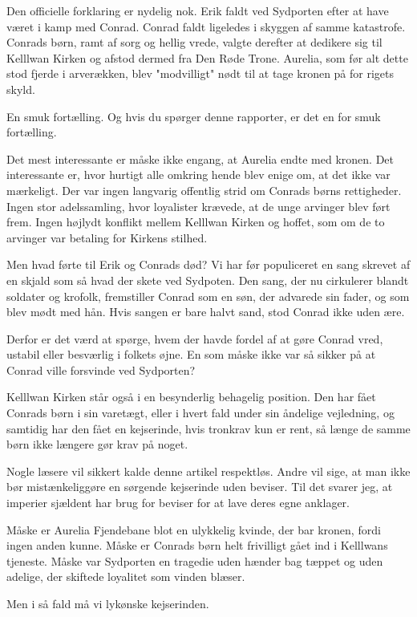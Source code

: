 \documentclass[a4paper,12pt]{memoir}
\begin{document}
Den officielle forklaring er nydelig nok. Erik faldt ved Sydporten efter at have været i kamp med Conrad. Conrad faldt ligeledes i skyggen af samme katastrofe. Conrads børn, ramt af sorg og hellig vrede, valgte derefter at dedikere sig til Kelllwan Kirken og afstod dermed fra Den Røde Trone. Aurelia, som før alt dette stod fjerde i arverækken, blev "modvilligt" nødt til at tage kronen på for rigets skyld.

En smuk fortælling. Og hvis du spørger denne rapporter, er det en for smuk fortælling.

Det mest interessante er måske ikke engang, at Aurelia endte med kronen. Det interessante er, hvor hurtigt alle omkring hende blev enige om, at det ikke var mærkeligt. Der var ingen langvarig offentlig strid om Conrads børns rettigheder. Ingen stor adelssamling, hvor loyalister krævede, at de unge arvinger blev ført frem. Ingen højlydt konflikt mellem Kelllwan Kirken og hoffet, som om de to arvinger var betaling for Kirkens stilhed.

Men hvad førte til Erik og Conrads død? Vi har før populiceret en sang skrevet af en skjald som så hvad der skete ved Sydpoten. Den sang, der nu cirkulerer blandt soldater og krofolk, fremstiller Conrad som en søn, der advarede sin fader, og som blev mødt med hån. Hvis sangen er bare halvt sand, stod Conrad ikke uden ære. 

Derfor er det værd at spørge, hvem der havde fordel af at gøre Conrad vred, ustabil eller besværlig i folkets øjne. En som måske ikke var så sikker på at Conrad ville forsvinde ved Sydporten?

Kelllwan Kirken står også i en besynderlig behagelig position. Den har fået Conrads børn i sin varetægt, eller i hvert fald under sin åndelige vejledning, og samtidig har den fået en kejserinde, hvis tronkrav kun er rent, så længe de samme børn ikke længere gør krav på noget.

Nogle læsere vil sikkert kalde denne artikel respektløs. Andre vil sige, at man ikke bør mistænkeliggøre en sørgende kejserinde uden beviser. Til det svarer jeg, at imperier sjældent har brug for beviser for at lave deres egne anklager.

Måske er Aurelia Fjendebane blot en ulykkelig kvinde, der bar kronen, fordi ingen anden kunne. Måske er Conrads børn helt frivilligt gået ind i Kelllwans tjeneste. Måske var Sydporten en tragedie uden hænder bag tæppet og uden adelige, der skiftede loyalitet som vinden blæser.

Men i så fald må vi lykønske kejserinden.
\end{document}
